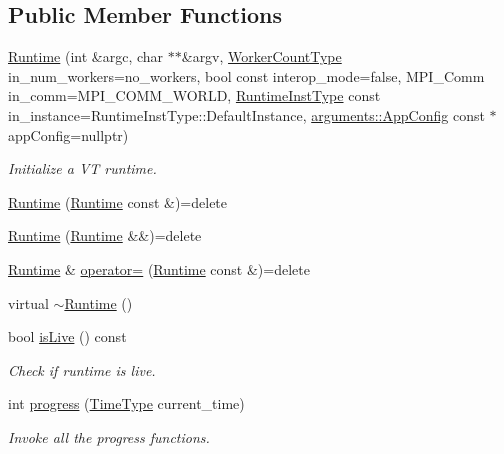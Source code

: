 \subsection*{Public Member Functions}
\begin{DoxyCompactItemize}
\item 
\hyperlink{structvt_1_1runtime_1_1_runtime_ad8bef210f0d845db8a7428f9477077a0}{Runtime} (int \&argc, char $\ast$$\ast$\&argv, \hyperlink{namespacevt_aa93398ea48f2cb6c188512250f7cc248}{Worker\+Count\+Type} in\+\_\+num\+\_\+workers=no\+\_\+workers, bool const interop\+\_\+mode=false, M\+P\+I\+\_\+\+Comm in\+\_\+comm=M\+P\+I\+\_\+\+C\+O\+M\+M\+\_\+\+W\+O\+R\+LD, \hyperlink{namespacevt_1_1runtime_afca910c1b38b3975f7c1da8001a77d58}{Runtime\+Inst\+Type} const in\+\_\+instance=Runtime\+Inst\+Type\+::\+Default\+Instance, \hyperlink{structvt_1_1arguments_1_1_app_config}{arguments\+::\+App\+Config} const $\ast$app\+Config=nullptr)
\begin{DoxyCompactList}\small\item\em Initialize a VT runtime. \end{DoxyCompactList}\item 
\hyperlink{structvt_1_1runtime_1_1_runtime_a42d87d965f2a283dbaf484b36b6a0c39}{Runtime} (\hyperlink{structvt_1_1runtime_1_1_runtime}{Runtime} const \&)=delete
\item 
\hyperlink{structvt_1_1runtime_1_1_runtime_a146708e42fa94f4d50bfdd6159f4d642}{Runtime} (\hyperlink{structvt_1_1runtime_1_1_runtime}{Runtime} \&\&)=delete
\item 
\hyperlink{structvt_1_1runtime_1_1_runtime}{Runtime} \& \hyperlink{structvt_1_1runtime_1_1_runtime_a30e1ddf6dd4950488044cf9608402193}{operator=} (\hyperlink{structvt_1_1runtime_1_1_runtime}{Runtime} const \&)=delete
\item 
virtual \hyperlink{structvt_1_1runtime_1_1_runtime_ae164ab301b823d985a62b7a5fb62cf07}{$\sim$\+Runtime} ()
\item 
bool \hyperlink{structvt_1_1runtime_1_1_runtime_a811947d9ba7322d0cb10c246200037c8}{is\+Live} () const
\begin{DoxyCompactList}\small\item\em Check if runtime is live. \end{DoxyCompactList}\item 
int \hyperlink{structvt_1_1runtime_1_1_runtime_a731e9f4a4fd6e21b067cbdc4ada11f03}{progress} (\hyperlink{namespacevt_a876a9d0cd5a952859c72de8a46881442}{Time\+Type} current\+\_\+time)
\begin{DoxyCompactList}\small\item\em Invoke all the progress functions. \end{DoxyCompactList}\item 
$$
\end{DoxyCompactItemize}
